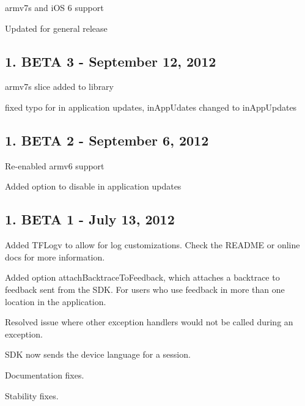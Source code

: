 
\begin{DoxyItemize}
\item armv7s and i\-O\-S 6 support
\item Updated for general release
\end{DoxyItemize}

\subsection*{1. B\-E\-T\-A 3 -\/ September 12, 2012}


\begin{DoxyItemize}
\item armv7s slice added to library
\item fixed typo for in application updates, in\-App\-Udates changed to in\-App\-Updates
\end{DoxyItemize}

\subsection*{1. B\-E\-T\-A 2 -\/ September 6, 2012}


\begin{DoxyItemize}
\item Re-\/enabled armv6 support
\item Added option to disable in application updates
\end{DoxyItemize}

\subsection*{1. B\-E\-T\-A 1 -\/ July 13, 2012}


\begin{DoxyItemize}
\item Added T\-F\-Logv to allow for log customizations. Check the R\-E\-A\-D\-M\-E or online docs for more information.
\item Added option attach\-Backtrace\-To\-Feedback, which attaches a backtrace to feedback sent from the S\-D\-K. For users who use feedback in more than one location in the application.
\item Resolved issue where other exception handlers would not be called during an exception.
\item S\-D\-K now sends the device language for a session.
\item Documentation fixes.
\item Stability fixes.
\end{DoxyItemize}

